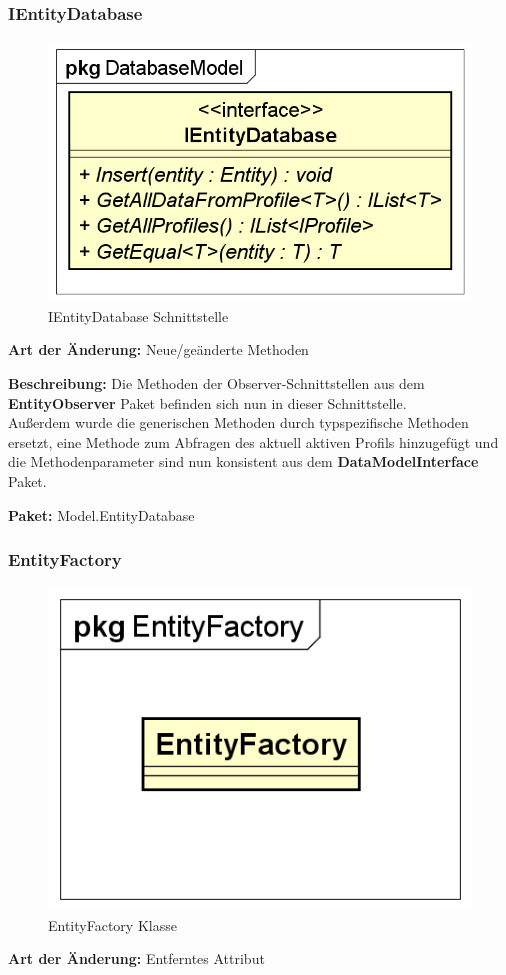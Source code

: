 \documentclass[a4paper]{scrreprt}
\begin{document}
\subsubsection{IEntityDatabase}
\begin{figure}[H]
\centering
\includegraphics[width=0.45\textheight]{graphics/Klassendiagramme/Model/IEntityDatabase.png}
\caption{IEntityDatabase Schnittstelle}
\end{figure}
\textbf{Art der Änderung:} Neue/geänderte Methoden

\textbf{Beschreibung:} Die Methoden der Observer-Schnittstellen aus dem \textbf{EntityObserver} Paket befinden sich nun in dieser Schnittstelle. \\
Außerdem wurde die generischen Methoden durch typspezifische Methoden ersetzt, eine Methode zum Abfragen des aktuell aktiven Profils hinzugefügt und die Methodenparameter sind nun konsistent aus dem \textbf{DataModelInterface} Paket.

\textbf{Paket:} Model.EntityDatabase

\subsubsection{EntityFactory}
\begin{figure}[H]
\centering
\includegraphics[width=0.45\textheight]{graphics/Klassendiagramme/Model/EntityFactory.png}
\caption{EntityFactory Klasse}
\end{figure}
\textbf{Art der Änderung:} Entferntes Attribut
\end{document}
